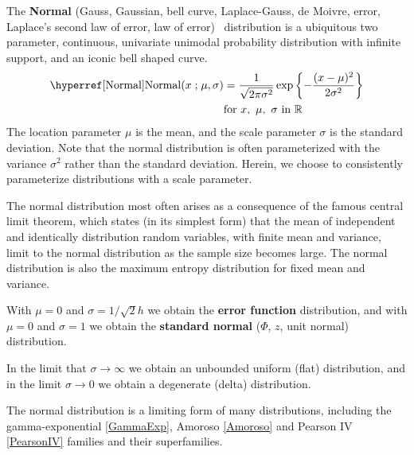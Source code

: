 

\label{sec:Normal}
The  {\bf Normal} (Gauss, Gaussian, bell curve, Laplace-Gauss, de Moivre, error, Laplace's second law of error, law of error)~\cite{Moivre1733,Johnson1994} distribution is a ubiquitous two parameter, continuous, univariate unimodal probability distribution with infinite support, and an iconic bell shaped curve. 
%
\begin{align}
\label{Normal}
\opr{Normal}(x\given \mu,\sigma) 
&=
\frac{1}{\sqrt{2 \pi \sigma^2}}  \exp\left\{ - \frac{( x-\mu)^2}{2\sigma^2} \right\} \checked
\\
& \text{for } x,\ \mu,\  \sigma \text{ in }  \mathbb{R}						\checked 
\notag
\end{align}
The location parameter $\mu$ is the mean, and the scale parameter $\sigma$ is the standard deviation. Note that the normal distribution is often parameterized with the variance $\sigma^2$ rather than the standard deviation. Herein, we choose to consistently parameterize distributions with a scale parameter.  

The normal distribution most often arises as a consequence of the famous central limit theorem, which states (in its simplest form) that the mean of independent and identically distribution random variables, with finite mean and variance, limit to the normal distribution as the sample size becomes large. 
The normal distribution is also the maximum entropy distribution for fixed mean and variance.




With $\mu=0$ and $\sigma = 1/ \sqrt{2} h$ we obtain the {\bf error function} distribution, and
with $\mu=0$ and $\sigma=1$ we obtain the {\bf standard normal} ($\Phi$, $z$, unit normal)  distribution. 


 In the limit that $\sigma\rightarrow\infty$ we obtain an unbounded uniform (flat) distribution, and in the limit $\sigma\rightarrow0$ we obtain a degenerate (delta) distribution. 
 
The normal distribution is a limiting form of many distributions, including the gamma-exponential \eqref{GammaExp}, Amoroso \eqref{Amoroso} and Pearson IV \eqref{PearsonIV} families and their superfamilies. 



